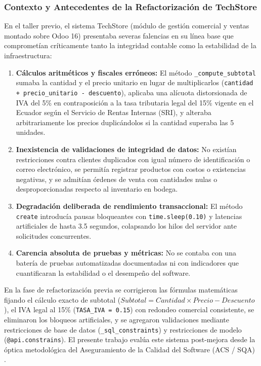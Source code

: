 \documentclass{article}
\begin{document}
\subsubsection{Contexto y Antecedentes de la Refactorización de TechStore}
En el taller previo, el sistema TechStore (módulo de gestión comercial y ventas montado sobre Odoo 16) presentaba severas falencias en su línea base que comprometían críticamente tanto la integridad contable como la estabilidad de la infraestructura:
\begin{enumerate}
    \item \textbf{Cálculos aritméticos y fiscales erróneos:} El método \texttt{\_compute\_subtotal} sumaba la cantidad y el precio unitario en lugar de multiplicarlos (\texttt{cantidad + precio\_unitario - descuento}), aplicaba una alícuota distorsionada de IVA del 5\% en contraposición a la tasa tributaria legal del 15\% vigente en el Ecuador según el Servicio de Rentas Internas (SRI), y alteraba arbitrariamente los precios duplicándolos si la cantidad superaba las 5 unidades.
    \item \textbf{Inexistencia de validaciones de integridad de datos:} No existían restricciones contra clientes duplicados con igual número de identificación o correo electrónico, se permitía registrar productos con costos o existencias negativas, y se admitían órdenes de venta con cantidades nulas o desproporcionadas respecto al inventario en bodega.
    \item \textbf{Degradación deliberada de rendimiento transaccional:} El método \texttt{create} introducía pausas bloqueantes con \texttt{time.sleep(0.10)} y latencias artificiales de hasta 3.5 segundos, colapsando los hilos del servidor ante solicitudes concurrentes.
    \item \textbf{Carencia absoluta de pruebas y métricas:} No se contaba con una batería de pruebas automatizadas documentadas ni con indicadores que cuantificaran la estabilidad o el desempeño del software.
\end{enumerate}

En la fase de refactorización previa se corrigieron las fórmulas matemáticas fijando el cálculo exacto de subtotal ($Subtotal = Cantidad \times Precio - Descuento$), el IVA legal al 15\% (\texttt{TASA\_IVA = 0.15}) con redondeo comercial consistente, se eliminaron los bloqueos artificiales, y se agregaron validaciones mediante restricciones de base de datos (\texttt{\_sql\_constraints}) y restricciones de modelo (\texttt{@api.constrains}). El presente trabajo evalúa este sistema post-mejora desde la óptica metodológica del Aseguramiento de la Calidad del Software (ACS / SQA) \cite{pressman2014, sommerville2011}.
\end{document}
